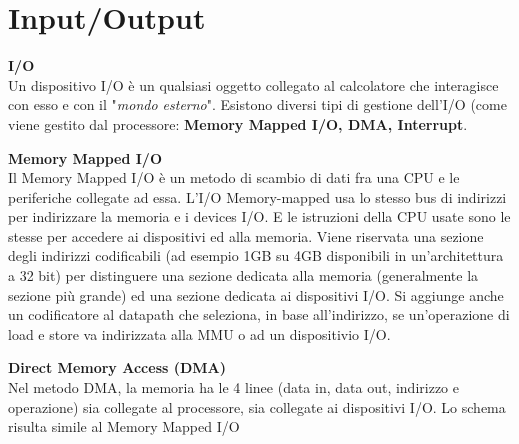 \chapter{Input/Output}

\begin{defn}
    \textbf{I/O} \\
    Un dispositivo I/O è un qualsiasi oggetto collegato al calcolatore che
    interagisce con esso e con il "\textit{mondo esterno}". Esistono diversi
    tipi di gestione dell'I/O (come viene gestito dal processore: \textbf{Memory
    Mapped I/O, DMA, Interrupt}.
\end{defn}

\begin{defn}
    \textbf{Memory Mapped I/O} \\
    Il Memory Mapped I/O è un metodo di scambio di dati fra una CPU e le
    periferiche collegate ad essa.
    L'I/O Memory-mapped usa lo stesso bus di indirizzi per indirizzare la
    memoria e i devices I/O. E le istruzioni della CPU usate sono le stesse per
    accedere ai dispositivi ed alla memoria.
    Viene riservata una sezione degli indirizzi codificabili (ad esempio 1GB
    su 4GB disponibili in un'architettura a 32 bit) per distinguere una sezione
    dedicata alla memoria (generalmente la sezione più grande) ed una sezione
    dedicata ai dispositivi I/O. Si aggiunge anche un codificatore al datapath
    che seleziona, in base all'indirizzo, se un'operazione di load e store va
    indirizzata alla MMU o ad un dispositivio I/O.
\end{defn}


\begin{defn}
    \textbf{Direct Memory Access (DMA)} \\
    Nel metodo DMA, la memoria ha le 4 linee (data in, data out, indirizzo e
    operazione) sia collegate al processore, sia collegate ai dispositivi I/O.
    Lo schema risulta simile al Memory Mapped I/O

\end{defn}
